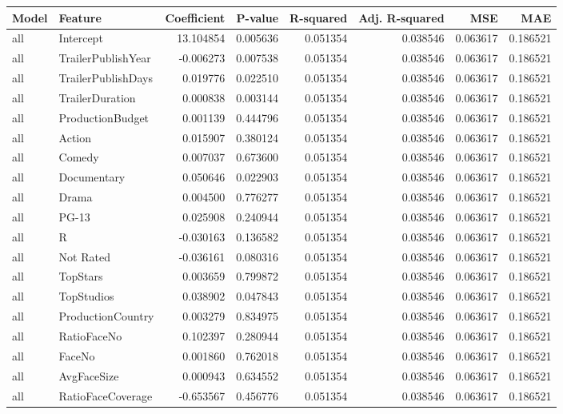 \begin{tabular}{llrrrrrr}
\toprule
Model & Feature & Coefficient & P-value & R-squared & Adj. R-squared & MSE & MAE \\
\midrule
all & Intercept & 13.104854 & 0.005636 & 0.051354 & 0.038546 & 0.063617 & 0.186521 \\
all & TrailerPublishYear & -0.006273 & 0.007538 & 0.051354 & 0.038546 & 0.063617 & 0.186521 \\
all & TrailerPublishDays & 0.019776 & 0.022510 & 0.051354 & 0.038546 & 0.063617 & 0.186521 \\
all & TrailerDuration & 0.000838 & 0.003144 & 0.051354 & 0.038546 & 0.063617 & 0.186521 \\
all & ProductionBudget & 0.001139 & 0.444796 & 0.051354 & 0.038546 & 0.063617 & 0.186521 \\
all & Action & 0.015907 & 0.380124 & 0.051354 & 0.038546 & 0.063617 & 0.186521 \\
all & Comedy & 0.007037 & 0.673600 & 0.051354 & 0.038546 & 0.063617 & 0.186521 \\
all & Documentary & 0.050646 & 0.022903 & 0.051354 & 0.038546 & 0.063617 & 0.186521 \\
all & Drama & 0.004500 & 0.776277 & 0.051354 & 0.038546 & 0.063617 & 0.186521 \\
all & PG-13 & 0.025908 & 0.240944 & 0.051354 & 0.038546 & 0.063617 & 0.186521 \\
all & R & -0.030163 & 0.136582 & 0.051354 & 0.038546 & 0.063617 & 0.186521 \\
all & Not Rated & -0.036161 & 0.080316 & 0.051354 & 0.038546 & 0.063617 & 0.186521 \\
all & TopStars & 0.003659 & 0.799872 & 0.051354 & 0.038546 & 0.063617 & 0.186521 \\
all & TopStudios & 0.038902 & 0.047843 & 0.051354 & 0.038546 & 0.063617 & 0.186521 \\
all & ProductionCountry & 0.003279 & 0.834975 & 0.051354 & 0.038546 & 0.063617 & 0.186521 \\
all & RatioFaceNo & 0.102397 & 0.280944 & 0.051354 & 0.038546 & 0.063617 & 0.186521 \\
all & FaceNo & 0.001860 & 0.762018 & 0.051354 & 0.038546 & 0.063617 & 0.186521 \\
all & AvgFaceSize & 0.000943 & 0.634552 & 0.051354 & 0.038546 & 0.063617 & 0.186521 \\
all & RatioFaceCoverage & -0.653567 & 0.456776 & 0.051354 & 0.038546 & 0.063617 & 0.186521 \\

\end{tabular}
